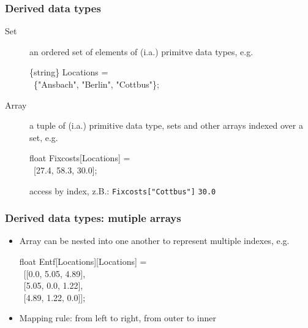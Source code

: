 \begin{frame}
 \frametitle{Derived data types}
 \begin{description}
  \item[Set] an ordered set of elements of (i.a.) primitve data types, e.g.
  \begin{flushleft}\ttfamily{}
  \{string\} Locations =\\\ \{"Ansbach", "Berlin", "Cottbus"\};
  \end{flushleft}
  \item[Array] a tuple of (i.a.) primitive data type, sets and other arrays indexed over a set, e.g.
  \begin{flushleft}\ttfamily{}
  float Fixcosts[Locations] =\\\ [27.4, 58.3, 30.0];
  \end{flushleft}
  access by index, z.B.: \texttt{Fixcosts["Cottbus"]} \textrightarrow{} \texttt{30.0}
 \end{description}
\end{frame}

\begin{frame}
 \frametitle{Derived data types: mutiple arrays}
 \begin{itemize}
  \item Array can be nested into one another to represent multiple indexes, e.g.
    \begin{flushleft}\ttfamily{}
      float Entf[Locations][Locations] =\\ 
      \ [[0.0, 5.05, 4.89],\\
      \ [5.05, 0.0, 1.22],\\
      \ [4.89, 1.22, 0.0]];
    \end{flushleft}
  \item Mapping rule: from left to right, from outer to inner
 \end{itemize}
\end{frame}

